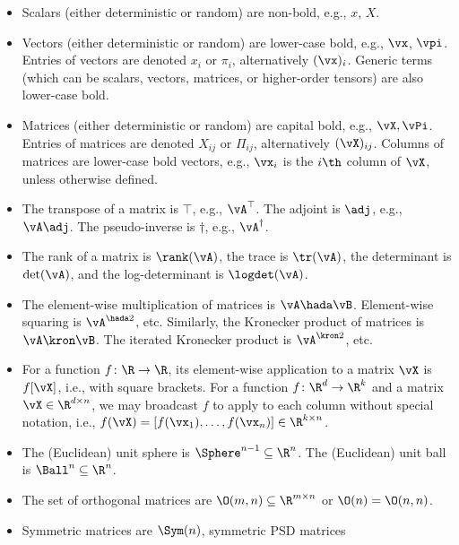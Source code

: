 \begin{itemize}
    \item Scalars (either deterministic or random) are non-bold,
        e.g., \(x\), \(X\).
    \item Vectors (either deterministic or random) are lower-case
        bold, e.g., \(\vx\), \(\vpi\). Entries of vectors are denoted
        \(x_{i}\) or \(\pi_{i}\), alternatively \((\vx)_{i}\).
        Generic terms (which can be scalars, vectors, matrices, or
        higher-order tensors) are also lower-case bold.
    \item Matrices (either deterministic or random) are capital bold,
        e.g., \(\vX, \vPi\). Entries of matrices are denoted
        \(X_{ij}\) or \(\Pi_{ij}\), alternatively \((\vX)_{ij}\).
        Columns of matrices are lower-case bold vectors, e.g.,
        \(\vx_{i}\) is the \(i\th\) column of \(\vX\), unless otherwise defined.
    \item The transpose of a matrix is \(\top\), e.g.,
        \(\vA^{\top}\). The adjoint is \(\adj\), e.g., \(\vA\adj\).
        The pseudo-inverse is \(\dagger\), e.g., \(\vA^{\dagger}\).
    \item The rank of a matrix is \(\rank(\vA)\), the trace is
        \(\tr(\vA)\), the determinant is \(\det(\vA)\), and the
        log-determinant is \(\logdet(\vA)\).
    \item The element-wise multiplication of matrices is \(\vA \hada
        \vB\). Element-wise squaring is
        \(\vA^{\hada 2}\), etc. Similarly, the Kronecker product of
        matrices is \(\vA \kron \vB\). The iterated Kronecker product
        is \(\vA^{\kron 2}\), etc.
    \item For a function \(f \colon \R \to \R\), its element-wise
        application to a matrix \(\vX\) is \(f[\vX]\), i.e., with
        square brackets. For a function \(f \colon \R^{d} \to
        \R^{k}\) and a matrix \(\vX \in \R^{d \times n}\), we may
        broadcast \(f\) to apply to each column without special
        notation, i.e., \(f(\vX) = [f(\vx_{1}), \dots, f(\vx_{n})]
        \in \R^{k \times n}\).
    \item The (Euclidean) unit sphere is \(\Sphere^{n - 1} \subseteq
        \R^{n}\). The (Euclidean) unit ball is \(\Ball^{n} \subseteq \R^{n}\).
    \item The set of orthogonal matrices are \(\O(m, n) \subseteq
        \R^{m \times n}\) or \(\O(n) = \O(n, n)\).
    \item Symmetric matrices are \(\Sym(n)\), symmetric PSD matrices

\end{itemize}
